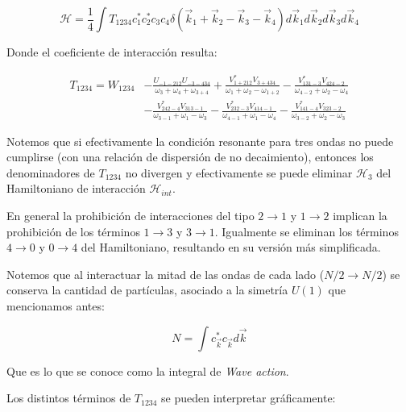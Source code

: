 \begin{equation}
	\mathcal{H} = \frac{1}{4} \int T_{1234} c_1^*c_2^*c_3c_4\delta(\vec k_1+\vec k_2 - \vec k_3 - \vec k_4) d\vec k_1d\vec k_2 d\vec k_3 d\vec k_4
\end{equation}

Donde el coeficiente de interacción resulta:

\begin{equation}
	\begin{split}
		T_{1234} = W_{1234} &-\frac{U_{-1-212}U_{-3-434}}{\omega_3+\omega_4+\omega_{3+4}} + \frac{V^*_{1+212}V_{3+434}}{\omega_1+\omega_2-\omega_{1+2}} 	-\frac{V^*_{131-3}V_{424-2}}{\omega_{4-2}+\omega_2-\omega_4} \\ 
		&- \frac{V^*_{242-4}V_{313-1}}{\omega_{3-1}+\omega_1-\omega_3} 
		-\frac{V^*_{232-3}V_{414-1}}{\omega_{4-1}+\omega_1-\omega_4}-\frac{V^*_{141-4}V_{323-2}}{\omega_{3-2}+\omega_2-\omega_3} 
	\end{split}
\end{equation} 

Notemos que si efectivamente la condición resonante para tres ondas no puede cumplirse (con una relación de dispersión de no decaimiento), entonces los denominadores de $T_{1234}$ no divergen y efectivamente se puede eliminar $\mathcal{H}_3$ del Hamiltoniano de interacción $\mathcal{H}_{int}$.

En general la prohibición de interacciones del tipo $2\rightarrow1$ y $1\rightarrow2$ implican la prohibición de los términos $1\rightarrow3$ y $3\rightarrow1$. Igualmente se eliminan los términos $4\rightarrow0$ y $0\rightarrow4$ del Hamiltoniano, resultando en su versión más simplificada.


Notemos que al interactuar la mitad de las ondas de cada lado ($N/2\rightarrow N/2$) se conserva la cantidad de partículas, asociado a la simetría $U(1)$ que mencionamos antes:

\begin{equation}
	N = \int c^*_{\vec k}c_{\vec k} d\vec k
	\label{eq:Wave_action_integral}
\end{equation}

Que es lo que se conoce como la integral de \textit{Wave action}.


Los distintos términos de $T_{1234}$ se pueden interpretar gráficamente:

